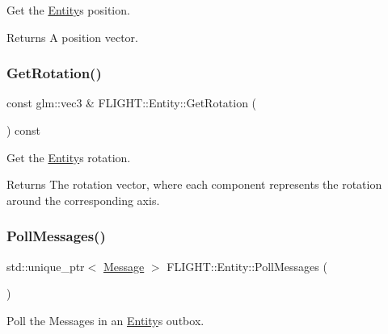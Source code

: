 Get the \hyperlink{class_f_l_i_g_h_t_1_1_entity}{Entity}\textquotesingle{}s position. 

\begin{DoxyReturn}{Returns}
A position vector. 
\end{DoxyReturn}
\mbox{\label{class_f_l_i_g_h_t_1_1_entity_ab46f5b05bea68723e1cf7bd7b81b9222}} 
\subsubsection{\texorpdfstring{Get\+Rotation()}{GetRotation()}}
{\footnotesize\ttfamily const glm\+::vec3 \& F\+L\+I\+G\+H\+T\+::\+Entity\+::\+Get\+Rotation (\begin{DoxyParamCaption}{ }\end{DoxyParamCaption}) const}



Get the \hyperlink{class_f_l_i_g_h_t_1_1_entity}{Entity}\textquotesingle{}s rotation. 

\begin{DoxyReturn}{Returns}
The rotation vector, where each component represents the rotation around the corresponding axis. 
\end{DoxyReturn}
\mbox{\label{class_f_l_i_g_h_t_1_1_entity_a34a22386784cea5c79c9b1e4930b3223}} 
\subsubsection{\texorpdfstring{Poll\+Messages()}{PollMessages()}}
{\footnotesize\ttfamily std\+::unique\+\_\+ptr$<$ \hyperlink{class_f_l_i_g_h_t_1_1_message}{Message} $>$ F\+L\+I\+G\+H\+T\+::\+Entity\+::\+Poll\+Messages (\begin{DoxyParamCaption}{ }\end{DoxyParamCaption})}



Poll the Messages in an \hyperlink{class_f_l_i_g_h_t_1_1_entity}{Entity}\textquotesingle{}s outbox. 

